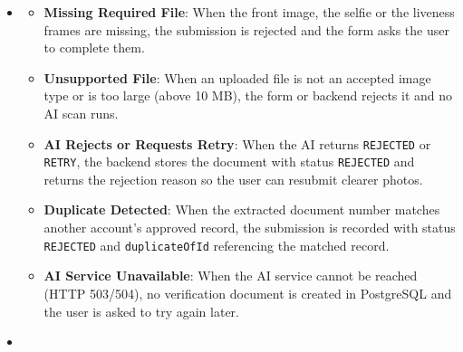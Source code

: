 \begin{itemize}[leftmargin=1.6em,topsep=4pt,itemsep=3pt,parsep=0pt,label=$\bullet$]
\begin{itemize}[leftmargin=2.2em,topsep=2pt,itemsep=3pt,parsep=0pt,label=$\circ$]
            \item \textbf{Store the Result}: Uploaded images are persisted and an \texttt{IdVerificationDocument} row is created with status \texttt{PENDING} (when AI returns \texttt{VERIFIED} and no duplicate is found) or \texttt{REJECTED} (when AI returns \texttt{REJECTED}/\texttt{RETRY} or a duplicate \texttt{identityNumber} matches another account, recording \texttt{duplicateOfId}).
            \item \textbf{Review by an Administrator}: Submissions saved as \texttt{PENDING} appear in the administrator identity verification screen, where an administrator reviews the uploaded images and approves or rejects the request.
            \item \textbf{Show the Status}: The user sees the current status of the request in the Identity tab (\texttt{PENDING}, \texttt{APPROVED}, or \texttt{REJECTED} with notes).
        \end{itemize}
    \item {}
        \begin{itemize}[leftmargin=2.2em,topsep=2pt,itemsep=3pt,parsep=0pt,label=$\circ$]
            \item \textbf{Missing Required File}: When the front image, the selfie or the liveness frames are missing, the submission is rejected and the form asks the user to complete them.
            \item \textbf{Unsupported File}: When an uploaded file is not an accepted image type or is too large (above 10 MB), the form or backend rejects it and no AI scan runs.
            \item \textbf{AI Rejects or Requests Retry}: When the AI returns \texttt{REJECTED} or \texttt{RETRY}, the backend stores the document with status \texttt{REJECTED} and returns the rejection reason so the user can resubmit clearer photos.
            \item \textbf{Duplicate Detected}: When the extracted document number matches another account's approved record, the submission is recorded with status \texttt{REJECTED} and \texttt{duplicateOfId} referencing the matched record.
            \item \textbf{AI Service Unavailable}: When the AI service cannot be reached (HTTP 503/504), no verification document is created in PostgreSQL and the user is asked to try again later.
        \end{itemize}
    \item {}

\end{itemize}
